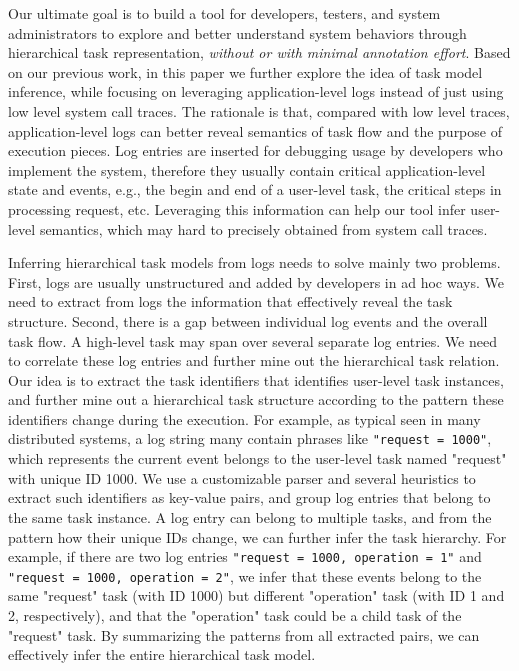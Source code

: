 Our ultimate goal is to build a tool for developers,
testers, and system administrators to explore and better
understand system behaviors through hierarchical task representation,
\emph{without or with minimal annotation effort}.
Based on our previous work, in this paper
we further explore the idea of task model inference,
while focusing on leveraging application-level logs instead of
just using low level system call traces.
The rationale is that, compared with low level traces,
application-level logs can better reveal semantics of
task flow and the purpose of execution pieces.
Log entries are inserted for debugging usage
by developers who implement the system, therefore they
usually contain critical application-level state and events,
e.g., the begin and end of a user-level task, the critical
steps in processing request, etc.
Leveraging this information can help our tool infer
user-level semantics, which may hard to precisely obtained
from system call traces.

Inferring hierarchical task models from logs needs to
solve mainly two problems. First, logs are usually unstructured
and added by developers in ad hoc ways. We need to extract
from logs the information that effectively reveal the task
structure. Second, there is a gap between individual log events
and the overall task flow. A high-level task may span over
several separate log entries. We need to correlate these
log entries and further mine out the hierarchical
task relation. Our idea is to extract the task identifiers
that identifies user-level task instances, and further
mine out a hierarchical task structure according to
the pattern these identifiers change during the execution.
For example, as typical seen in many distributed systems,
a log string many contain phrases like
\texttt{"request = 1000"}, which represents the current event
belongs to the user-level task named "request" with unique ID 1000.
We use a customizable parser and several heuristics
to extract such identifiers as key-value pairs,
and group log entries that belong to the same task instance.
A log entry can belong to multiple tasks, and from the
pattern how their unique IDs change, we can further
infer the task hierarchy.
For example, if there are two log entries
\texttt{"request = 1000, operation = 1"} and
\texttt{"request = 1000, operation = 2"},
we infer that these events belong to the same "request" task
(with ID 1000) but different "operation" task (with ID 1 and 2,
respectively), and that the "operation" task could be
a child task of the "request" task.
By summarizing the patterns from all extracted pairs,
we can effectively infer the entire hierarchical task model.

